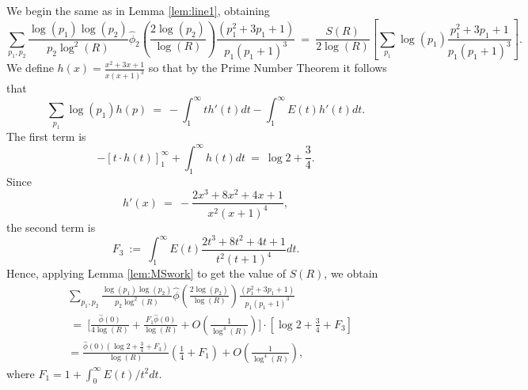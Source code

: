 \documentclass[11pt, reqno]{amsart}
\makeatletter
\renewenvironment{proof}[1][\proofname]{\par
  \vspace{-.7\topsep}%
  \pushQED{\qed}%
  \normalfont
  \topsep0pt \partopsep0pt %
  \trivlist
  \item[\hskip\labelsep
        \itshape
    #1\@addpunct{.}]\ignorespaces
}{%
  \popQED\endtrivlist\@endpefalse
  \addvspace{6pt plus 6pt} %
}
\theoremstyle{definition}
\theoremstyle{remark}
\numberwithin{equation}{section}
\renewcommand{\hat}{\widehat}
\makeatother
\begin{document}
\begin{proof}
    We begin the same as in Lemma \ref{lem:line1}, obtaining
    \begin{equation}
        \sum_{p_1,p_2} \frac{\log(p_1)\log(p_2)}{p_2\log^2(R)}\hat\phi_2\left(\frac{2\log(p_2)}{\log(R)}\right)\frac{(p_1^2+3p_1+1)}{p_1(p_1+1)^3}\ =\ \frac{S(R)}{2\log(R)}\left[\sum_{p_1} \log(p_1) \frac{p_1^2+3p_1+1}{p_1(p_1+1)^3}\right].
    \end{equation}
    We define $h(x)=\frac{x^2+3x+1}{x(x+1)^3}$ so that by the Prime Number Theorem it follows that
    \begin{equation}
        \sum_{p_1} \log(p_1) h(p) \ = \ -\int_1^\infty th'(t)dt-\int_1^\infty E(t)h'(t)dt.
    \end{equation}
    The first term is
    \begin{equation}
        -[t\cdot h(t)]_1^\infty +\int_1^\infty h(t)dt \ =\ \log 2 + \frac{3}{4}.
    \end{equation}
    Since
    \begin{equation}
        h'(x)\ = \ -\frac{2x^3+8x^2+4x+1}{x^2(x+1)^4},
    \end{equation}
    the second term is
    \begin{equation}
        F_3 \ :=\ \int_1^\infty E(t)\frac{2t^3+8t^2+4t+1}{t^2(t+1)^4}dt.
    \end{equation}
    Hence, applying Lemma \ref{lem:MSwork} to get the value of $S(R)$, we obtain
        \begin{equation}
        \begin{aligned}
        & \sum_{p_1,p_2} \frac{\log(p_1)\log(p_2)}{p_2\log^2(R)}\hat\phi\left(\frac{2\log(p_2)}{\log(R)}\right)\frac{(p_1^2+3p_1+1)}{p_1(p_1+1)^3}\\
        & \ = \ \bigg[\frac{\hat\phi(0)}{4\log(R)}+\frac{F_1\hat\phi(0)}{\log(R)}+O\left(\frac{1}{\log^4(R)}\right)\bigg]\cdot
        \left[\log{2} + \frac{3}{4}+F_3\right]\\
        &=\frac{\hat\phi(0)(\log 2+\frac{3}{4}+F_3)}{\log(R)}\left(\frac{1}{4}+F_1\right)+O\left(\frac{1}{\log^4(R)}\right),
        \end{aligned}
    \end{equation}
where $F_1=1+\int_0^\infty E(t)/t^2 dt.$ 
\end{proof}
\end{document}
